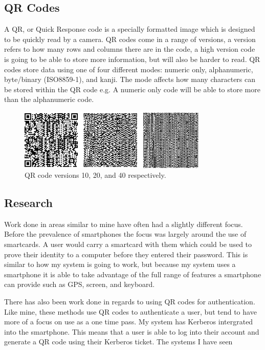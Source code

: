 \documentclass[]{report}   %
\begin{document}
\subsection{QR Codes}  
A QR, or Quick Response code \cite{QR} is a specially formatted image which is designed to be quickly read by a camera. QR codes come in a range of versions, a version refers to how many rows and columns there are in the code, a high version code is going to be able to store more information, but will also be harder to read. QR codes store data using one of four different modes: numeric only, alphanumeric, byte/binary (ISO8859-1), and kanji. The mode affects how many characters can be stored within the QR code e.g. A numeric only code will be able to store more than the alphanumeric code.

\begin{figure}[H]
\centering
\includegraphics[width=9cm]{QRCodes.png}
\caption{QR code versions 10, 20, and 40 respectively.}
\end{figure}

\subsection{Research}
Work done in areas similar to mine have often had a slightly different focus. Before the prevalence of smartphones the focus was largely around the use of smartcards. \cite{SmartCards} A user would carry a smartcard with them which could be used to prove their identity to a computer before they entered their password. This is similar to how my system is going to work, but because my system uses a smartphone it is able to take advantage of the full range of features a smartphone can provide such as GPS, screen, and keyboard.

There has also been work done in regards to using QR codes for authentication. Like mine, these methods use QR codes to authenticate a user, but tend to have more of a focus on use as a one time pass. My system has Kerberos intergrated into the smartphone. This means that a user is able to log into their account and generate a QR code using their Kerberos ticket. The systems I have seen 
\end{document}

